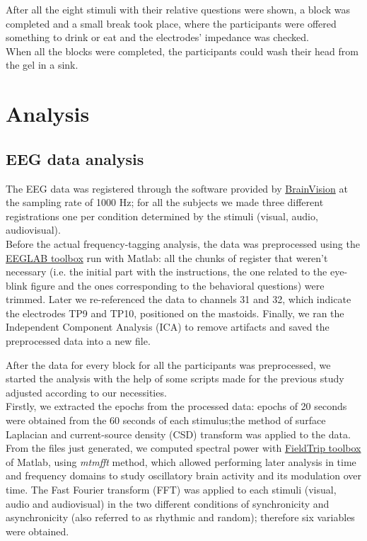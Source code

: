 After all the eight stimuli with their relative questions were shown, a block was completed and a small break took place, where the participants were offered something to drink or eat and the electrodes' impedance was checked. \\
When all the blocks were completed, the participants could wash their head from the gel in a sink.

\section{Analysis}
\subsection{EEG data analysis}
The EEG data was registered through the software provided by \href{https://brainvision.com/applications/brain-vision-software/}{BrainVision} at the sampling rate of 1000 Hz; for all the subjects we made three different registrations one per condition determined by the stimuli (visual, audio, audiovisual). \\
Before the actual frequency-tagging analysis, the data was preprocessed using the \href{https://eeglab.org/}{EEGLAB toolbox} run with Matlab: all the chunks of register that weren't necessary (i.e. the initial part with the instructions, the one related to the eye-blink figure and the ones corresponding to the behavioral questions) were trimmed. Later we re-referenced the data to channels 31 and 32, which indicate the electrodes TP9 and TP10, positioned on the mastoids. Finally, we ran the Independent Component Analysis (ICA) to remove artifacts and saved the preprocessed data into a new file. 

After the data for every block for all the participants was preprocessed, we started the analysis with the help of some scripts made for the previous study adjusted according to our necessities. \\
Firstly, we extracted the epochs from the processed data: epochs of 20 seconds were obtained from the 60 seconds of each stimulus;the method of surface Laplacian and current-source density (CSD) transform was applied to the data. \\
From the files just generated, we computed spectral power with \href{https://www.fieldtriptoolbox.org/}{FieldTrip toolbox} of Matlab, using \textit{mtmfft} method, which allowed performing later analysis in time and frequency domains to study oscillatory brain activity and its modulation over time. The Fast Fourier transform (FFT) was applied to each stimuli (visual, audio and audiovisual) in the two different conditions of synchronicity and asynchronicity (also referred to as rhythmic and random); therefore six variables were obtained. 

